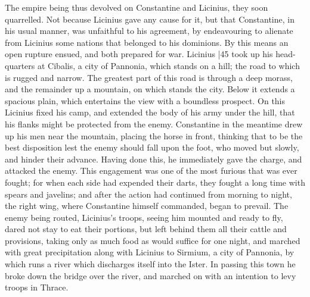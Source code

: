 The empire being thus devolved on Constantine and Licinius, they soon quarrelled. Not because Licinius gave any cause for it, but that Constantine, in his usual manner, was unfaithful to his agreement, by endeavouring to alienate from Licinius some nations that belonged to his dominions. By this means an open rupture ensued, and both prepared for war. Licinius
|45 took up his head-quarters at Cibalis, a city of Pannonia, which stands on a hill; the road to which is rugged and narrow. The greatest part of this road is through a deep morass, and the remainder up a mountain, on which stands the city. Below it extends a spacious plain, which entertains the view with a boundless prospect. On this Licinius fixed his camp, and extended the body of his army under the hill, that his flanks might be protected from the enemy. Constantine in the meantime drew up his men near the mountain, placing the horse in front, thinking that to be the best disposition lest the enemy should fall upon the foot, who moved but slowly, and hinder their advance. Having done this, he immediately gave the charge, and attacked the enemy. This engagement was one of the most furious that was ever fought; for when each side had expended their darts, they fought a long time with spears and javelins; and after the action had continued from morning to night, the right wing, where Constantine himself commanded, began to prevail. The enemy being routed, Licinius's troops, seeing him mounted and ready to fly, dared not stay to eat their portions, but left behind them all their cattle and provisions, taking only as much food as would suffice for one night, and marched with great precipitation along with Licinius to Sirmium, a city of Pannonia, by which runs a river which discharges itself into the Ister. In passing this town he broke down the bridge over the river, and marched on with an intention to levy troops in Thrace.

